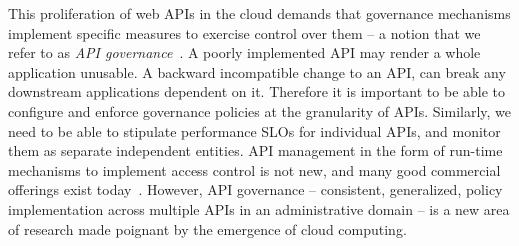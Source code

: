 This proliferation of web APIs in the cloud demands that governance
mechanisms implement specific measures to exercise control over them -- a notion that we refer
to as \textit{API governance}~\cite{6903538}. A poorly implemented API may render a whole application unusable.
A backward incompatible change to an API, can break any downstream applications dependent on it. 
Therefore it is important to be able to configure and enforce governance policies at the granularity of
APIs. Similarly, we need to be able to stipulate performance SLOs for individual APIs, and monitor
them as separate independent entities.
API management in the form of run-time mechanisms to implement
access control is not new, and many good commercial offerings exist today~\cite{3scale,apigee,layer7}.   
However, API governance -- consistent, generalized, policy
implementation across multiple APIs in an administrative domain --
is a new area of research made poignant by the emergence of cloud computing.